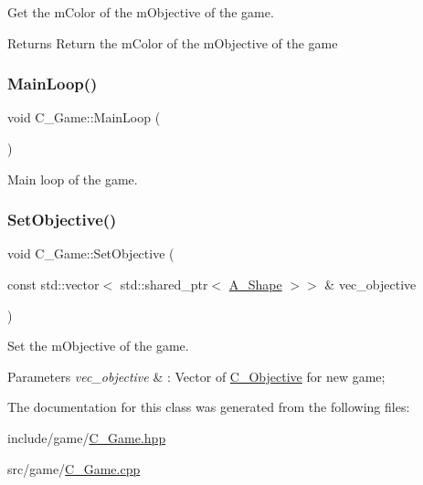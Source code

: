 Get the m\+Color of the m\+Objective of the game. 

\begin{DoxyReturn}{Returns}
Return the m\+Color of the m\+Objective of the game 
\end{DoxyReturn}
\mbox{\label{classC__Game_aa15149075c2a4bd4704235d83c1c4f20}} 
\subsubsection{\texorpdfstring{Main\+Loop()}{MainLoop()}}
{\footnotesize\ttfamily void C\+\_\+\+Game\+::\+Main\+Loop (\begin{DoxyParamCaption}{ }\end{DoxyParamCaption})}



Main loop of the game. 

\mbox{\label{classC__Game_a0fa57725991fb2b249eb40dd776a68c4}} 
\subsubsection{\texorpdfstring{Set\+Objective()}{SetObjective()}}
{\footnotesize\ttfamily void C\+\_\+\+Game\+::\+Set\+Objective (\begin{DoxyParamCaption}\item[{const std\+::vector$<$ std\+::shared\+\_\+ptr$<$ \hyperlink{classA__Shape}{A\+\_\+\+Shape} $>$$>$ \&}]{vec\+\_\+objective }\end{DoxyParamCaption})}



Set the m\+Objective of the game. 


\begin{DoxyParams}{Parameters}
{\em vec\+\_\+objective} & \+: Vector of \hyperlink{classC__Objective}{C\+\_\+\+Objective} for new game; \\
\hline
\end{DoxyParams}


The documentation for this class was generated from the following files\+:\begin{DoxyCompactItemize}
\item 
include/game/\hyperlink{C__Game_8hpp}{C\+\_\+\+Game.\+hpp}\item 
src/game/\hyperlink{C__Game_8cpp}{C\+\_\+\+Game.\+cpp}\end{DoxyCompactItemize}
